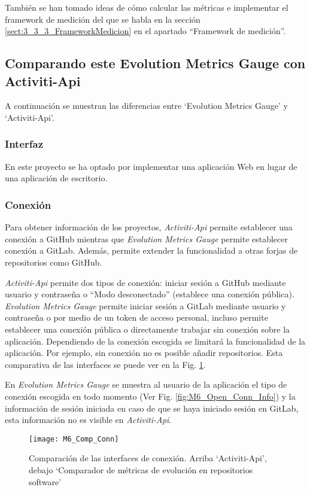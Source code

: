 También se han tomado ideas de cómo calcular las métricas e implementar el framework de medición del que se habla en la sección \ref{sect:3_3_3_FrameworkMedicion} en el apartado ``Framework de medición''.

\subsection{Comparando este Evolution Metrics Gauge con Activiti-Api}

A continuación se muestran las diferencias entre `Evolution Metrics Gauge' y `Activiti-Api'.

\subsubsection{Interfaz}

En este proyecto se ha optado por implementar una aplicación Web en lugar de una aplicación de escritorio.

\subsubsection{Conexión}

Para obtener información de los proyectos, \textit{Activiti-Api} permite establecer una conexión a GitHub mientras que \textit{Evolution Metrics Gauge} permite establecer conexión a GitLab. Además, permite extender la funcionalidad a otras forjas de repositorios como GitHub.

\textit{Activiti-Api} permite dos tipos de conexión: iniciar sesión a GitHub mediante usuario y contraseña o ``Modo desconectado'' (establece una conexión pública). \textit{Evolution Metrics Gauge} permite iniciar sesión a GitLab mediante usuario y contraseña o por medio de un token de acceso personal, incluso permite establecer una conexión pública o directamente trabajar sin conexión sobre la aplicación. Dependiendo de la conexión escogida se limitará la funcionalidad de la aplicación. Por ejemplo, sin conexión no es posible añadir repositorios. Esta comparativa de las interfaces se puede ver en la Fig. \ref{fig:M6_Comp_Conn}.

En \textit{Evolution Metrics Gauge} se muestra al usuario de la aplicación el tipo de conexión escogida en todo momento (Ver Fig. \ref{fig:M6_Open_Conn_Info}) y la información de sesión iniciada en caso de que se haya iniciado sesión en GitLab, esta información no es visible en \textit{Activiti-Api}.

\begin{figure}[!h]
	\centering
	\texttt{[image: M6\_Comp\_Conn]}
	\caption{Comparación de las interfaces de conexión. Arriba `Activiti-Api', debajo `Comparador de métricas de evolución en repositorios software'}\label{fig:M6_Comp_Conn}
\end{figure}
\FloatBarrier


